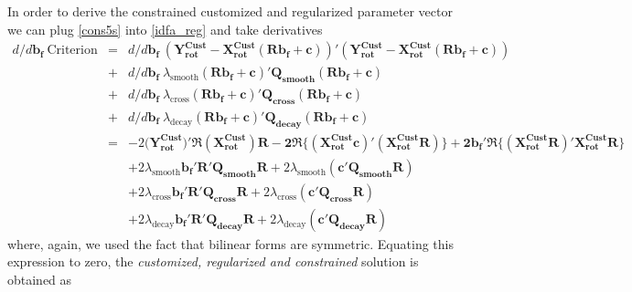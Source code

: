 \documentclass[11pt]{article}
\begin{document}
In order to derive the constrained customized and regularized parameter vector we can  plug \ref{cons5s} into \ref{idfa_reg} and take derivatives 
\begin{eqnarray*}
d/d\mathbf{b_f}~\textrm{Criterion}&=&d/d\mathbf{b_f}~(\mathbf{Y_{\textrm{rot}}^{\textrm{Cust}}-X_{\textrm{rot}}^{\textrm{Cust}}\left(\mathbf{R b_{f}}+\mathbf{c}\right)})'(\mathbf{Y_{\textrm{rot}}^{\textrm{Cust}}-X_{\textrm{rot}}^{\textrm{Cust}}\left(\mathbf{R b_{f}}+\mathbf{c}\right)})\nonumber\\
&+&d/d\mathbf{b_f}~\lambda_{\textrm{smooth}}\mathbf{\left(\mathbf{R b_{f}}+\mathbf{c}\right)'Q_{smooth}\left(\mathbf{R b_{f}}+\mathbf{c}\right)}\\
&+&d/d\mathbf{b_f}~\lambda_{\textrm{cross}}\mathbf{\left(\mathbf{R b_{f}}+\mathbf{c}\right)'Q_{cross}\left(\mathbf{R b_{f}}+\mathbf{c}\right)}\\
&+&d/d\mathbf{b_f}~\lambda_{\textrm{decay}}\mathbf{\left(\mathbf{R b_{f}}+\mathbf{c}\right)'Q_{decay}\left(\mathbf{R b_{f}}+\mathbf{c}\right)}\\
&=&-2(\mathbf{Y_{\textrm{rot}}^{\textrm{Cust}})'\Re\left(X_{\textrm{rot}}^{\textrm{Cust}}\right)R-
2\Re\bigg\{\mathbf{(X_{\textrm{rot}}^{\textrm{Cust}}c)'(X_{\textrm{rot}}^{\textrm{Cust}}R)}\bigg\}
+2b_f'\Re\bigg\{(X_{\textrm{rot}}^{\textrm{Cust}}R)'X_{\textrm{rot}}^{\textrm{Cust}}R\bigg\}}\\
&&+2\lambda_{\textrm{smooth}}\mathbf{b_f'R'Q_{smooth}R}+2\lambda_{\textrm{smooth}}\mathbf{(c'Q_{\textrm{smooth}}R)}\\
&&+2\lambda_{\textrm{cross}}\mathbf{b_f'R'Q_{cross}R}+2\lambda_{\textrm{cross}}\mathbf{(c'Q_{\textrm{cross}}R)}\\
&&+2\lambda_{\textrm{decay}}\mathbf{b_f'R'Q_{decay}R}+2\lambda_{\textrm{decay}}\mathbf{(c'Q_{\textrm{decay}}R)}
\end{eqnarray*}
where, again, we used the fact that bilinear forms are symmetric. Equating this expression to zero, the \emph{customized, regularized and constrained }solution is obtained as
\end{document}
